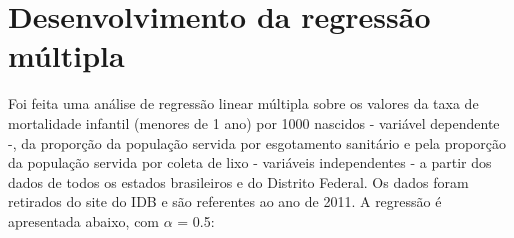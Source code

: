 \chapter{Desenvolvimento da regressão múltipla}
Foi feita uma análise de regressão linear múltipla sobre os valores da taxa de mortalidade infantil (menores de 1 ano) por 1000 nascidos - variável dependente -, da proporção
da população servida por esgotamento sanitário e pela proporção da população servida por coleta de lixo - variáveis independentes - a partir dos dados de todos os estados brasileiros
e do Distrito Federal. Os dados foram retirados do site do IDB \cite{idb} e são referentes ao ano de 2011. A regressão é apresentada abaixo, com $\alpha$ = 0.5:
\newline
\begin{table}[h]
\centering
{}
\end{table}
